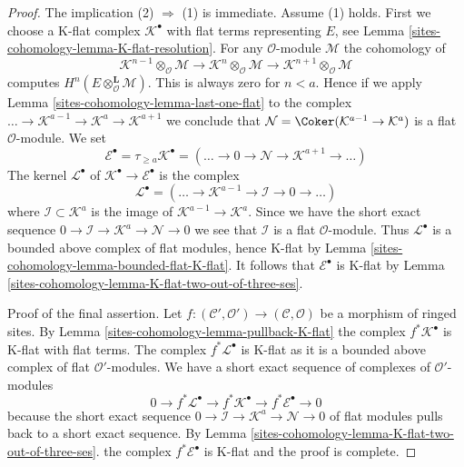 \begin{proof}
The implication (2) $\Rightarrow$ (1) is immediate. Assume (1) holds.
First we choose a K-flat complex $\mathcal{K}^\bullet$
with flat terms representing $E$, see Lemma \ref{sites-cohomology-lemma-K-flat-resolution}.
For any $\mathcal{O}$-module $\mathcal{M}$ the cohomology of
$$
\mathcal{K}^{n - 1} \otimes_\mathcal{O} \mathcal{M} \to
\mathcal{K}^n \otimes_\mathcal{O} \mathcal{M} \to
\mathcal{K}^{n + 1} \otimes_\mathcal{O} \mathcal{M}
$$
computes $H^n(E \otimes_\mathcal{O}^\mathbf{L} \mathcal{M})$.
This is always zero for $n < a$. Hence if we apply
Lemma \ref{sites-cohomology-lemma-last-one-flat} to the complex
$\ldots \to \mathcal{K}^{a - 1} \to \mathcal{K}^a \to \mathcal{K}^{a + 1}$
we conclude that $\mathcal{N} = \Coker(\mathcal{K}^{a - 1} \to \mathcal{K}^a)$
is a flat $\mathcal{O}$-module. We set
$$
\mathcal{E}^\bullet = \tau_{\geq a}\mathcal{K}^\bullet =
(\ldots \to 0 \to \mathcal{N} \to \mathcal{K}^{a + 1} \to \ldots )
$$
The kernel $\mathcal{L}^\bullet$ of
$\mathcal{K}^\bullet \to \mathcal{E}^\bullet$ is the complex
$$
\mathcal{L}^\bullet = (\ldots \to \mathcal{K}^{a - 1} \to
\mathcal{I} \to 0 \to \ldots)
$$
where $\mathcal{I} \subset \mathcal{K}^a$ is the image of
$\mathcal{K}^{a - 1} \to \mathcal{K}^a$.
Since we have the short exact sequence
$0 \to \mathcal{I} \to \mathcal{K}^a \to \mathcal{N} \to 0$
we see that $\mathcal{I}$ is a flat $\mathcal{O}$-module.
Thus $\mathcal{L}^\bullet$ is a bounded
above complex of flat modules, hence K-flat by
Lemma \ref{sites-cohomology-lemma-bounded-flat-K-flat}.
It follows that $\mathcal{E}^\bullet$ is K-flat by
Lemma \ref{sites-cohomology-lemma-K-flat-two-out-of-three-ses}.

\medskip\noindent
Proof of the final assertion. Let
$f : (\mathcal{C}', \mathcal{O}') \to (\mathcal{C}, \mathcal{O})$
be a morphism of ringed sites. By Lemma \ref{sites-cohomology-lemma-pullback-K-flat}
the complex $f^*\mathcal{K}^\bullet$ is K-flat with flat terms.
The complex $f^*\mathcal{L}^\bullet$ is K-flat as it is a bounded
above complex of flat $\mathcal{O}'$-modules. We have a short exact
sequence of complexes of $\mathcal{O}'$-modules
$$
0 \to f^*\mathcal{L}^\bullet \to f^*\mathcal{K}^\bullet \to
f^*\mathcal{E}^\bullet \to 0
$$
because the short exact sequence
$0 \to \mathcal{I} \to \mathcal{K}^a \to \mathcal{N} \to 0$
of flat modules pulls back to a short exact sequence.
By Lemma \ref{sites-cohomology-lemma-K-flat-two-out-of-three-ses}.
the complex $f^*\mathcal{E}^\bullet$ is K-flat and the proof is complete.
\end{proof}


